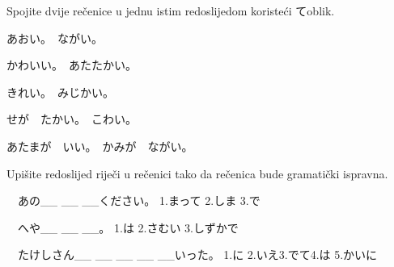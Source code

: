 

\author{Tomislav Mamić, Željka Ludošan}	%


	
	
	\begin{mondai}{Spojite dvije rečenice u jednu istim redoslijedom koristeći てoblik.}
		\item あおい。　ながい。
		\item かわいい。　あたたかい。
		\item きれい。　みじかい。
		\item せが　たかい。　こわい。
		\item あたまが　いい。　かみが　ながい。
	\end{mondai}

	\begin{mondai}{Upišite redoslijed riječi u rečenici tako da rečenica bude gramatički ispravna.
			
			\begin{reibun}[Primjer:]
		\end{reibun} }
		
		\item　あの\_\_ \_\_ \_\_ください。
		\vspace{10pt}
		\newline 1.まって 2.しま 3.で
		\vspace{20pt}
		\item　へや\_\_ \_\_ \_\_。
		\vspace{10pt}
		\newline 1.は 2.さむい 3.しずかで
		\vspace{20pt}
		\item　たけしさん\_\_ \_\_ \_\_ \_\_ \_\_いった。
		\vspace{10pt}
		\newline 1.に 2.いえ3.でて4.は 5.かいに
	\end{mondai}

